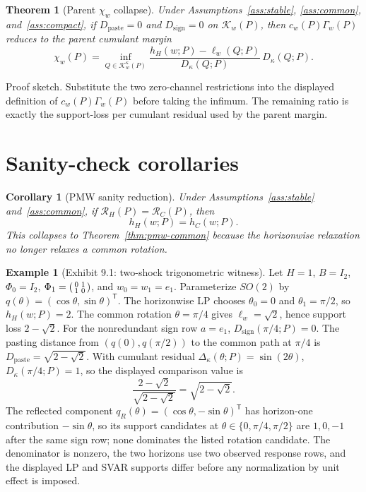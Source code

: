 \documentclass[11pt]{article}
\newcommand{\transpose}{\mathsf{T}}
\theoremstyle{definition}
\newtheorem{example}{Example}
\theoremstyle{plain}
\newtheorem{theorem}{Theorem}
\newtheorem{corollary}{Corollary}
\theoremstyle{remark}
\begin{document}
\begin{theorem}[Parent \(\chi_w\) collapse]\label{thm:chi-collapse}
Under Assumptions~\ref{ass:stable}, \ref{ass:common}, and~\ref{ass:compact}, if
\(D_{\mathrm{paste}}=0\) and \(D_{\mathrm{sign}}=0\) on
\(\mathcal K_w(P)\), then \(c_w(P)\Gamma_w(P)\) reduces to the parent cumulant
margin
\[
\chi_w(P)=
\inf_{Q\in\mathcal K_w^\kappa(P)}
\frac{h_H(w;P)-\ell_w(Q;P)}{D_\kappa(Q;P)}\,D_\kappa(Q;P).
\]
\end{theorem}
Proof sketch. Substitute the two zero-channel restrictions into the displayed
definition of \(c_w(P)\Gamma_w(P)\) before taking the infimum. The remaining
ratio is exactly the support-loss per cumulant residual used by the parent
margin.

\section{Sanity-check corollaries}
\begin{corollary}[PMW sanity reduction]\label{cor:pmw}
Under Assumptions~\ref{ass:stable} and~\ref{ass:common}, if
\(\mathcal R_H(P)=\mathcal R_C(P)\), then
\[
h_H(w;P)=h_C(w;P).
\]
This collapses to Theorem~\ref{thm:pmw-common} because the horizonwise
relaxation no longer relaxes a common rotation.
\end{corollary}

\begin{example}[Exhibit 9.1: two-shock trigonometric witness]\label{ex:trig}
Let \(H=1\), \(B=I_2\), \(\Phi_0=I_2\),
\(\Phi_1=\begin{psmallmatrix}0&1\\1&0\end{psmallmatrix}\), and
\(w_0=w_1=e_1\). Parameterize \(SO(2)\) by
\(q(\theta)=(\cos\theta,\sin\theta)^\transpose\). The horizonwise LP chooses
\(\theta_0=0\) and \(\theta_1=\pi/2\), so \(h_H(w;P)=2\). The common rotation
\(\theta=\pi/4\) gives \(\ell_w=\sqrt2\), hence support loss \(2-\sqrt2\).
For the nonredundant sign row \(a=e_1\), \(D_{\mathrm{sign}}(\pi/4;P)=0\).
The pasting distance from \((q(0),q(\pi/2))\) to the common path at
\(\pi/4\) is \(D_{\mathrm{paste}}=\sqrt{2-\sqrt2}\). With cumulant residual
\(\Delta_\kappa(\theta;P)=\sin(2\theta)\), \(D_\kappa(\pi/4;P)=1\), so the
displayed comparison value is
\[
\frac{2-\sqrt2}{\sqrt{2-\sqrt2}}=\sqrt{2-\sqrt2}.
\]
The reflected component \(q_R(\theta)=(\cos\theta,-\sin\theta)^\transpose\)
has horizon-one contribution \(-\sin\theta\), so its support candidates at
\(\theta\in\{0,\pi/4,\pi/2\}\) are \(1,0,-1\) after the same sign row; none
dominates the listed rotation candidate. The denominator is nonzero, the two
horizons use two observed response rows, and the displayed LP and SVAR supports
differ before any normalization by unit effect is imposed.
\end{example}
\end{document}
